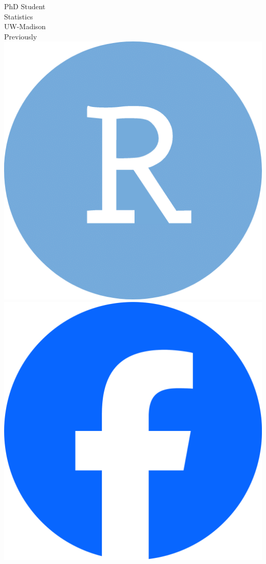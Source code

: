 \documentclass[aspectratio=169]{beamer}
\theoremstyle{remark}
\begin{document}
\begin{frame}
\begin{columns}
\begin{column}{0.33\textwidth}
            PhD Student \\
            Statistics \\
            UW-Madison \\
            \vspace{4mm}
            Previously \\
            \vspace{6mm}
            \includegraphics[height=0.1\textheight]{./figures/RStudio.png} \hspace{0.5mm}
            \includegraphics[height=0.1\textheight]{./figures/Facebook_Logo_Primary.png} \hspace{0.5mm}

\end{column}
\end{columns}
\end{frame}
\end{document}
